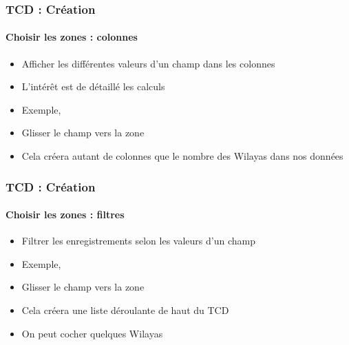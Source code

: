 \documentclass[xcolor=table, usenames,dvipsnames]{beamer}
\begin{document}
\begin{frame}
\frametitle{TCD : Création}
\framesubtitle{Choisir les zones : colonnes}

\begin{minipage}{0.39\textwidth}
	\begin{itemize}
		\item Afficher les différentes valeurs d'un champ dans les colonnes
		\item L'intérêt est de détaillé les calculs
	\end{itemize}
\end{minipage}
%
\begin{minipage}{0.6\textwidth} 
\end{minipage}
\begin{itemize}
	\item Exemple, 
	\item Glisser le champ  vers la zone 
	\item Cela créera autant de colonnes que le nombre des Wilayas dans nos données
\end{itemize}

\end{frame}

\begin{frame}
\frametitle{TCD : Création}
\framesubtitle{Choisir les zones : filtres}

\begin{minipage}{0.39\textwidth}
	\begin{itemize}
		\item Filtrer les enregistrements selon les valeurs d'un champ
		\item Exemple, 
	\end{itemize}
\end{minipage}
%
\begin{minipage}{0.6\textwidth} 
\end{minipage}

\begin{minipage}{0.79\textwidth}
	\begin{itemize}
		\item Glisser le champ  vers la zone 
		\item Cela créera une liste déroulante de haut du TCD
		\item On peut cocher quelques Wilayas 
	\end{itemize}
\end{minipage}
%
\begin{minipage}{0.2\textwidth} 
\end{minipage}


\end{frame}
\end{document}
